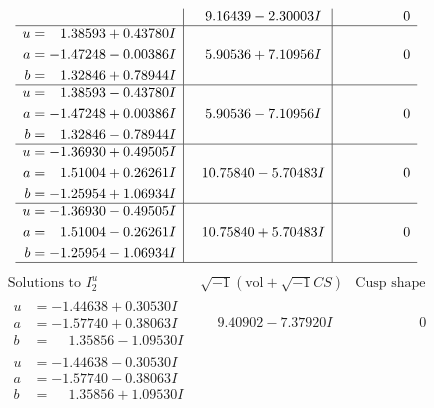 \documentclass[1p]{elsarticle_modified}
\theoremstyle{definition}
\newcommand{\I}{\sqrt{-1}}
\begin{document}
$$\begin{array}{c|c|c}
 & \phantom{-}9.16439 - 2.30003 I & \phantom{-0.000000 } 0 \\ \hline\begin{aligned}
u &= \phantom{-}1.38593 + 0.43780 I \\
a &= -1.47248 - 0.00386 I \\
b &= \phantom{-}1.32846 + 0.78944 I\end{aligned}
 & \phantom{-}5.90536 + 7.10956 I & \phantom{-0.000000 } 0 \\ \hline\begin{aligned}
u &= \phantom{-}1.38593 - 0.43780 I \\
a &= -1.47248 + 0.00386 I \\
b &= \phantom{-}1.32846 - 0.78944 I\end{aligned}
 & \phantom{-}5.90536 - 7.10956 I & \phantom{-0.000000 } 0 \\ \hline\begin{aligned}
u &= -1.36930 + 0.49505 I \\
a &= \phantom{-}1.51004 + 0.26261 I \\
b &= -1.25954 + 1.06934 I\end{aligned}
 & \phantom{-}10.75840 - 5.70483 I & \phantom{-0.000000 } 0 \\ \hline\begin{aligned}
u &= -1.36930 - 0.49505 I \\
a &= \phantom{-}1.51004 - 0.26261 I \\
b &= -1.25954 - 1.06934 I\end{aligned}
 & \phantom{-}10.75840 + 5.70483 I & \phantom{-0.000000 } 0\\
 \hline 
 \end{array}$$\newpage$$\begin{array}{c|c|c}  
\text{Solutions to }I^u_{2}& \I (\text{vol} + \sqrt{-1}CS) & \text{Cusp shape}\\
 \hline 
\begin{aligned}
u &= -1.44638 + 0.30530 I \\
a &= -1.57740 + 0.38063 I \\
b &= \phantom{-}1.35856 - 1.09530 I\end{aligned}
 & \phantom{-}9.40902 - 7.37920 I & \phantom{-0.000000 } 0 \\ \hline\begin{aligned}
u &= -1.44638 - 0.30530 I \\
a &= -1.57740 - 0.38063 I \\
b &= \phantom{-}1.35856 + 1.09530 I\end{aligned}

\end{array}$$
\end{document}
